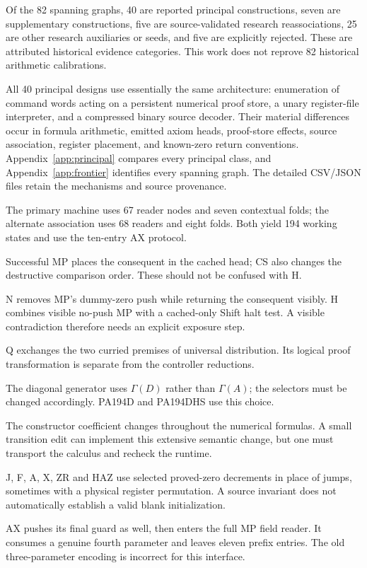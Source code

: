 \documentclass[11pt,letterpaper]{article}
\theoremstyle{definition}\newtheorem{definition}[theorem]{Definition}
\theoremstyle{remark}\newtheorem{remark}[theorem]{Remark}
\begin{document}
Of the 82 spanning graphs, 40 are reported principal constructions, seven
are supplementary constructions, five are source-validated research
reassociations, 25 are other research auxiliaries or seeds, and five are
explicitly rejected. These are attributed historical evidence categories.
This work does not reprove 82 historical arithmetic calibrations.

All 40 principal designs use essentially the same architecture: enumeration
of command words acting on a persistent numerical proof store, a unary
register-file interpreter, and a compressed binary source decoder. Their
material differences occur in formula arithmetic, emitted axiom heads,
proof-store effects, source association, register placement, and known-zero
return conventions. Appendix~\ref{app:principal} compares every principal
class, and Appendix~\ref{app:frontier} identifies every spanning graph.
The detailed CSV/JSON files retain the mechanisms and source provenance.

\begin{description}[style=nextline]
\item[Original and alternate associations.]
The primary machine uses 67 reader nodes and seven contextual folds; the
alternate association uses 68 readers and eight folds. Both yield 194
working states and use the ten-entry AX protocol.
\item[C and CS.]
Successful MP places the consequent in the cached head; CS also changes
the destructive comparison order. These should not be confused with H.
\item[N and H.]
N removes MP's dummy-zero push while returning the consequent visibly.
H combines visible no-push MP with a cached-only Shift halt test. A visible
contradiction therefore needs an explicit exposure step.
\item[Q.]
Q exchanges the two curried premises of universal distribution. Its
logical proof transformation is separate from the controller reductions.
\item[D.]
The diagonal generator uses $\Gamma(D)$ rather than $\Gamma(A)$; the
selectors must be changed accordingly. PA194D and PA194DHS use this choice.
\item[Radix 5 and 6.]
The constructor coefficient changes throughout the numerical formulas.
A small transition edit can implement this extensive semantic change, but
one must transport the calculus and recheck the runtime.
\item[Known-zero returns and register permutations.]
J, F, A, X, ZR and HAZ use selected proved-zero decrements in place of jumps,
sometimes with a physical register permutation. A source invariant does
not automatically establish a valid blank initialization.
\item[AX11.]
AX pushes its final guard as well, then enters the full MP field reader.
It consumes a genuine fourth parameter and leaves eleven prefix entries.
The old three-parameter encoding is incorrect for this interface.
\end{description}
\end{document}
